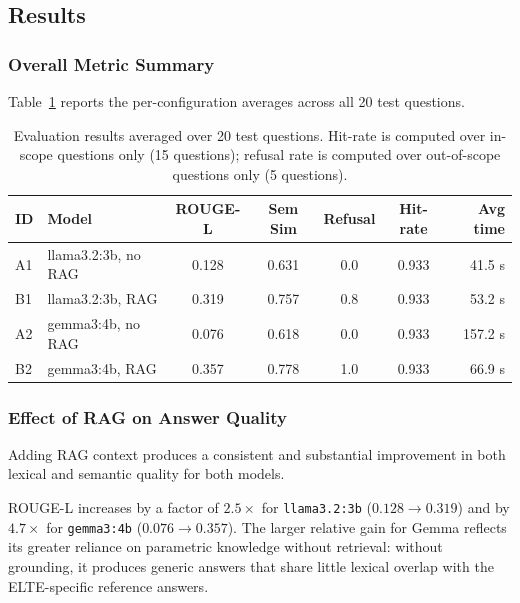 \subsection{Results}
\label{sec:eval-results}
 
\subsubsection*{Overall Metric Summary}
 
Table~\ref{tab:eval-summary} reports the per-configuration averages across all
20 test questions.
 
\begin{table}[H]
    \centering
    \begin{tabular}{|l|l|c|c|c|c|r|}
        \hline
        \textbf{ID} & \textbf{Model} & \textbf{ROUGE-L} & \textbf{Sem Sim} & \textbf{Refusal} & \textbf{Hit-rate} & \textbf{Avg time} \\
        \hline\hline
        A1 & llama3.2:3b, no RAG & 0.128 & 0.631 & 0.0 & 0.933 & 41.5 s \\
        B1 & llama3.2:3b, RAG    & 0.319 & 0.757 & 0.8 & 0.933 & 53.2 s \\
        A2 & gemma3:4b,   no RAG & 0.076 & 0.618 & 0.0 & 0.933 & 157.2 s \\
        B2 & gemma3:4b,   RAG    & 0.357 & 0.778 & 1.0 & 0.933 & 66.9 s \\
        \hline
    \end{tabular}
    \caption{Evaluation results averaged over 20 test questions. Hit-rate is
    computed over in-scope questions only (15 questions); refusal rate is
    computed over out-of-scope questions only (5 questions).}
    \label{tab:eval-summary}
\end{table}
 
\subsubsection*{Effect of RAG on Answer Quality}
 
Adding RAG context produces a consistent and substantial improvement in both
lexical and semantic quality for both models.
 
ROUGE-L increases by a factor of $2.5\times$ for \texttt{llama3.2:3b}
($0.128 \to 0.319$) and by $4.7\times$ for \texttt{gemma3:4b}
($0.076 \to 0.357$). The larger relative gain for Gemma reflects its greater
reliance on parametric knowledge without retrieval: without grounding, it
produces generic answers that share little lexical overlap with the
ELTE-specific reference answers.
 
